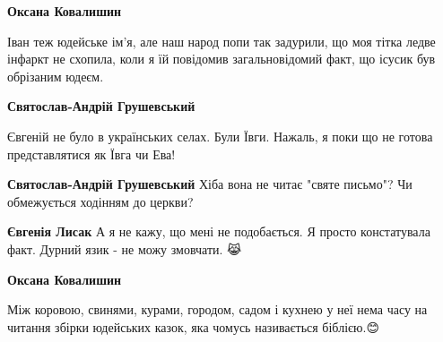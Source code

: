 \begin{itemize}
\begin{itemize}
 
\textbf{Оксана Ковалишин} 

Іван теж юдейське ім'я, але наш народ попи так задурили, що моя тітка ледве
інфаркт не схопила, коли я їй повідомив загальновідомий факт, що ісусик був
обрізаним юдеєм.🤣🤣🤣


 
\textbf{Святослав-Андрій Грушевський} 

Євгеній не було в українських селах. Були
Ївги. Нажаль, я поки що не готова представлятися як Ївга чи Ева!


 
\textbf{Святослав-Андрій Грушевський} Хіба вона не читає "святе письмо"? Чи обмежується ходінням до церкви? \Smiley[1.0][yellow]

 
\textbf{Євгенія Лисак} А я не кажу, що мені не подобається. Я просто констатувала факт. Дурний язик - не можу змовчати. 😹

 
\textbf{Оксана Ковалишин} 

Між коровою, свинями, курами, городом, садом і кухнею у неї нема часу на читання
збірки юдейських казок, яка чомусь називається біблією.😊



\end{itemize}
\end{itemize}
